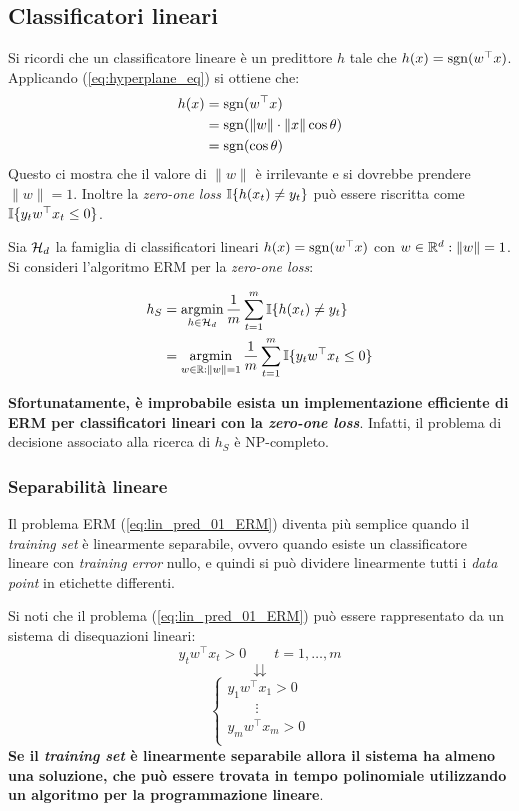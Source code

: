 \subsection{Classificatori lineari}
Si ricordi che un classificatore lineare è un predittore $h$ tale che
$h(x)=\operatorname*{sgn}(w^\top x)$. Applicando (\ref{eq:hyperplane_eq}) si ottiene che:
$$ \begin{aligned}
   h(x)&=\operatorname*{sgn}(w^\top x)\\
   &=\operatorname*{sgn}(\|w\|\cdot\|x\|\cos\theta)\\
   &=\operatorname*{sgn}(\cos\theta)\\
\end{aligned} $$
Questo ci mostra che il valore di $\|w\|$ è irrilevante e si dovrebbe
prendere $\|w\|=1$. Inoltre la \textit{zero-one loss} $\mathbb{I}\{h(x_t)\neq y_t\}$
può essere riscritta come $\mathbb{I}\{y_tw^\top x_t\leq 0\}$.

Sia $\mathcal{H}_d$ la famiglia di classificatori lineari $h(x)=\operatorname*{sgn}(w^\top x)$
con $w \in \mathbb{R}^d:\|w\|=1$. Si consideri l'algoritmo ERM per la 
\textit{zero-one loss}:

\begin{align}
h_S &= \operatorname*{argmin}_{h\in\mathcal{H}_d}\frac{1}{m}\sum_{t=1}^{m}\mathbb{I}\{h(x_t)\neq y_t\}
   \notag\\
&= \operatorname*{argmin}_{w\in\mathbb{R}:\|w\|=1}\frac{1}{m}\sum_{t=1}^{m}\mathbb{I}\{y_tw^\top x_t\leq 0\}
\label{eq:lin_pred_01_ERM}
\end{align}

\textbf{Sfortunatamente, è improbabile esista un implementazione efficiente
di ERM per classificatori lineari con la \textit{zero-one loss}}. Infatti,
il problema di decisione associato alla ricerca di $h_S$ è NP-completo.

\subsubsection{Separabilità lineare}

Il problema ERM (\ref{eq:lin_pred_01_ERM}) diventa più semplice quando il 
\textit{training set} è linearmente separabile, ovvero quando esiste un 
classificatore lineare con \textit{training error} nullo, e quindi si può 
dividere linearmente tutti i \textit{data point} in etichette differenti.

Si noti che il problema (\ref{eq:lin_pred_01_ERM}) può essere rappresentato 
da un sistema di disequazioni lineari:
$$ y_tw^\top x_t >0 \qquad t=1,\dots,m $$
$$ \downdownarrows $$
$$ \begin{cases}
y_1 w^\top x_1 >0 \\
\qquad\vdots \\
y_m w^\top x_m >0 \\
\end{cases} $$
\textbf{Se il \textit{training set} è linearmente separabile allora il
sistema ha almeno una soluzione, che può essere trovata in tempo polinomiale
utilizzando un algoritmo per la programmazione lineare}.

